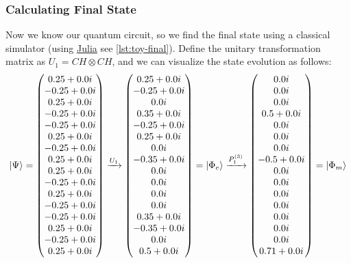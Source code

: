 \documentclass[11pt, oneside, listof=totoc]{scrbook}
\renewcommand{\d}{1}
\begin{document}
\subsubsection{Calculating Final State}

Now we know our quantum circuit, so we find the final state using a classical simulator (using \href{https://julialang.org/}{Julia} see \cref{lst:toy-final}). Define the unitary transformation matrix as \(U_1 = CH \otimes CH\), and we can visualize the state evolution as follows:
\begin{equation*}
    \ket{\Psi} = \mqty(
    0.25+0.0 i  \\
    -0.25+0.0 i \\
    0.25+0.0 i  \\
    -0.25+0.0 i \\
    -0.25+0.0 i \\
    0.25+0.0 i  \\
    -0.25+0.0 i \\
    0.25+0.0 i  \\
    0.25+0.0 i  \\
    -0.25+0.0 i \\
    0.25+0.0 i  \\
    -0.25+0.0 i \\
    -0.25+0.0 i \\
    0.25+0.0 i  \\
    -0.25+0.0 i \\
    0.25+0.0 i
    ) \xrightarrow{U_1}
    \mqty(
    0.25+0.0 i \\
    -0.25+0.0 i \\
    0.0 i \\
    0.35+0.0 i \\
    -0.25+0.0 i \\
    0.25+0.0 i \\
    0.0 i \\
    -0.35+0.0 i \\
    0.0 i \\
    0.0 i \\
    0.0 i \\
    0.0 i \\
    0.35+0.0 i \\
    -0.35+0.0 i \\
    0.0 i \\
    0.5+0.0 i
    ) = \ket{\Phi_e} \xrightarrow{P_{\d}^{(3)}}
    \mqty(
    0.0 i \\
    0.0 i \\
    0.0 i \\
    0.5+0.0 i \\
    0.0 i \\
    0.0 i \\
    0.0 i \\
    -0.5+0.0 i \\
    0.0 i \\
    0.0 i \\
    0.0 i \\
    0.0 i \\
    0.0 i \\
    0.0 i \\
    0.0 i \\
    0.71+0.0 i
    ) = \ket{\Phi_m}
\end{equation*}
\end{document}
